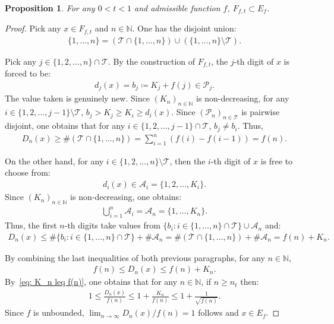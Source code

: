 \documentclass[12pt,reqno]{amsart}
\theoremstyle{definition}
\theoremstyle{plain}
\newtheorem{prop}{Proposition}
\begin{document}
\begin{prop}\label{prop: F_t is a subset of E_f}
    For any $0<t<1$ and admissible function $f$, $F_{f,t}\subset E_f$.
\end{prop}
\begin{proof}
    Pick any $x\in F_{f,t}$ and $n\in\mathbb{N}$. One has the disjoint union:
    \begin{align*}
        \{1,\ldots,n\}
        =\left(\mathcal{T}\cap\{1,\ldots,n\}\right)\cup\left(\{1,\ldots,n\}\setminus\mathcal{T}\right).
    \end{align*}

    Pick any $j\in\{1,2,\ldots,n\}\cap\mathcal{T}$. By the construction of $F_{f,t}$,  the $j$-th digit of $x$ is forced to be:
    \begin{align*}
        d_j(x)=b_j\coloneqq K_j+f(j)\in \mathcal{P}_j.
    \end{align*}
    The value taken is genuinely new. Since $(K_n)_{n\in\mathbb{N}}$ is non-decreasing, for any $i\in\{1,2,\ldots,j-1\}\setminus\mathcal{T}$, $b_j>K_j\geq K_i\geq d_i(x)$.
    Since $(\mathcal{P}_n)_{n\in\mathcal{T}}$ is pairwise disjoint, one obtains that for any $i\in\{1,2,\ldots,j-1\}\cap\mathcal{T}$, $b_j\ne b_i$.
    Thus,
    \begin{align*}
        D_n(x)
        \geq
        \#\left(\mathcal{T}\cap\{1,\ldots,n\}\right)
        =\sum_{i=1}^n\left(f(i)-f(i-1)\right)
        =f(n).
    \end{align*}

    On the other hand, for any $i\in\{1,2,\ldots,n\}\setminus\mathcal{T}$, then the $i$-th digit of $x$ is free to choose from:
    \begin{align*}
        d_i(x)\in\mathcal{A}_i=\{1,2,\ldots,K_i\}.
    \end{align*}
    Since $(K_n)_{n\in\mathbb{N}}$ is non-decreasing, one obtains:
    \begin{align*}
        \bigcup_{i=1}^n \mathcal{A}_i=\mathcal{A}_n=\{1,\ldots,K_n\}.
    \end{align*}
    Thus, the first $n$-th digits take values from $\{b_i:i\in\{1,\ldots,n\}\cap\mathcal{T}\}\cup\mathcal{A}_n$ and:
    \begin{align*}
        D_n(x)
        \leq \#\{b_i:i\in\{1,\ldots,n\}\cap\mathcal{T}\}+\#{\mathcal{A}_n}
        =
        \#\left(\mathcal{T}\cap\{1,\ldots,n\}\right)+\#{\mathcal{A}_n} 
        =f(n)+K_n.
    \end{align*}

    By combining the last inequalities of both previous paragraphs, for any $n\in\mathbb{N}$,
    \begin{align*}
        f(n)\leq D_n(x) \leq f(n)+K_n.
    \end{align*}
    By~\eqref{eq: K_n leq f(n)}, one obtains that for any $n\in\mathbb{N}$, if $n\geq n_t$ then: 
    \begin{align*}
        1\leq\frac{D_n(x)}{f(n)}\leq 1+\frac{K_n}{f(n)}\leq1+\frac{1}{\sqrt{f(n)}}.
    \end{align*}
    Since $f$ is unbounded, $\lim_{n\to\infty} D_n(x)/f(n)=1$ follows and $x\in E_f$.
\end{proof}
\end{document}
